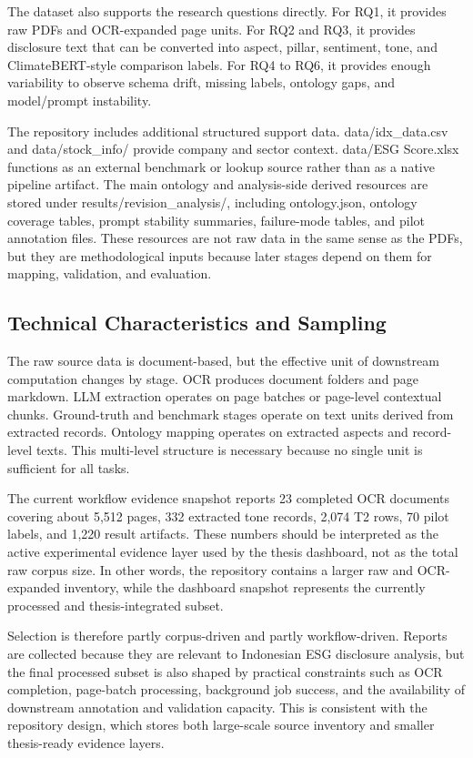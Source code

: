 The dataset also supports the research questions directly. For RQ1, it provides raw PDFs and OCR-expanded page units. For RQ2 and RQ3, it provides disclosure text that can be converted into aspect, pillar, sentiment, tone, and ClimateBERT-style comparison labels. For RQ4 to RQ6, it provides enough variability to observe schema drift, missing labels, ontology gaps, and model/prompt instability.

The repository includes additional structured support data. data/idx\_data.csv and data/stock\_info/ provide company and sector context. data/ESG Score.xlsx functions as an external benchmark or lookup source rather than as a native pipeline artifact. The main ontology and analysis-side derived resources are stored under results/revision\_analysis/, including ontology.json, ontology coverage tables, prompt stability summaries, failure-mode tables, and pilot annotation files. These resources are not raw data in the same sense as the PDFs, but they are methodological inputs because later stages depend on them for mapping, validation, and evaluation.

\subsection{Technical Characteristics and Sampling}

The raw source data is document-based, but the effective unit of downstream computation changes by stage. OCR produces document folders and page markdown. LLM extraction operates on page batches or page-level contextual chunks. Ground-truth and benchmark stages operate on text units derived from extracted records. Ontology mapping operates on extracted aspects and record-level texts. This multi-level structure is necessary because no single unit is sufficient for all tasks.

The current workflow evidence snapshot  reports 23 completed OCR documents covering about 5,512 pages, 332 extracted tone records, 2,074 T2 rows, 70 pilot labels, and 1,220 result artifacts. These numbers should be interpreted as the active experimental evidence layer used by the thesis dashboard, not as the total raw corpus size. In other words, the repository contains a larger raw and OCR-expanded inventory, while the dashboard snapshot represents the currently processed and thesis-integrated subset.

Selection is therefore partly corpus-driven and partly workflow-driven. Reports are collected because they are relevant to Indonesian ESG disclosure analysis, but the final processed subset is also shaped by practical constraints such as OCR completion, page-batch processing, background job success, and the availability of downstream annotation and validation capacity. This is consistent with the repository design, which stores both large-scale source inventory and smaller thesis-ready evidence layers.

